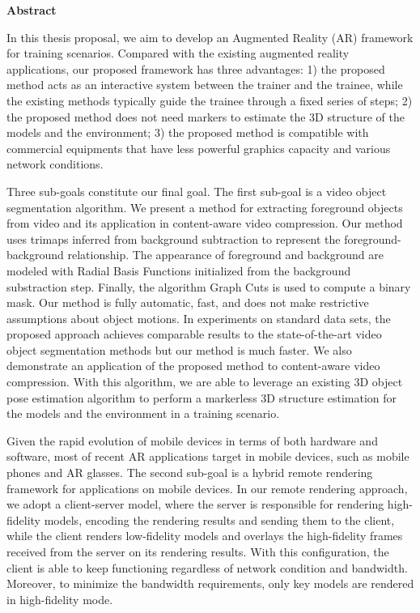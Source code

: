 
\begin{center}\textbf{Abstract}\end{center}

In this thesis proposal, we aim to develop an Augmented Reality (AR) framework for training scenarios.
Compared with the existing augmented reality applications, our proposed framework has three advantages: 1) the proposed method acts as an interactive system between the trainer and the trainee, while the existing methods typically guide the trainee through a fixed series of steps; 2) the proposed method does not need markers to estimate the 3D structure of the models and the environment; 3) the proposed method is compatible with commercial equipments that have less powerful graphics capacity and various network conditions.

Three sub-goals constitute our final goal.
The first sub-goal is a video object segmentation algorithm.
We present a method for extracting foreground objects from video and its application in content-aware video compression. Our method uses trimaps inferred from background subtraction to represent the foreground-background relationship. The appearance of foreground and background are modeled with Radial Basis Functions initialized from the background substraction step. Finally, the algorithm Graph Cuts is used to compute a binary mask. Our method is fully automatic, fast, and does not make restrictive assumptions about object motions. In experiments on standard data sets, the proposed approach achieves comparable results to the state-of-the-art video object segmentation methods but our method is much faster. We also demonstrate an application of the proposed method to content-aware video compression.
With this algorithm, we are able to leverage an existing 3D object pose estimation algorithm to perform a markerless 3D structure estimation for the models and the environment in a training scenario.

Given the rapid evolution of mobile devices in terms of both hardware and software, most of recent AR applications target in mobile devices, such as mobile phones and AR glasses.
The second sub-goal is a hybrid remote rendering framework for applications on mobile devices. In our remote rendering approach, we adopt a client-server model, where the server is responsible for rendering high-fidelity models, encoding the rendering results and sending them to the client, while the client renders low-fidelity models and overlays the high-fidelity frames received from the server on its rendering results. With this configuration, the client is able to keep functioning regardless of network condition and bandwidth. Moreover, to minimize the bandwidth requirements, only key models are rendered in high-fidelity mode.

